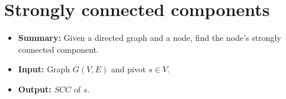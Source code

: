 \section{Strongly connected components} \label{algorithm-scc}
\begin{itemize}
    \item \textbf{Summary:} Given a directed graph and a node, find the node's strongly connected component.
    \item \textbf{Input:} Graph $G(V,E)$ and pivot $s \in V$.
    \item \textbf{Output:} $SCC$ of $s$.
\end{itemize}



